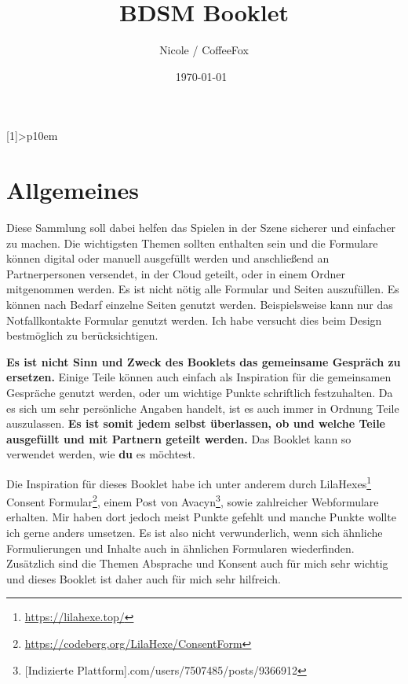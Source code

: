 \documentclass[a4paper,12pt]{article}
\begin{document}
\setlength\dashlinedash{0.2pt}
\setlength\dashlinegap{1.5pt}
\setlength\arrayrulewidth{0.3pt}
\newcolumntype{P}[1]{>{\centering\arraybackslash}p{10em}}


\title{BDSM Booklet}
\author{Nicole / CoffeeFox}
\date{\today \ \currenttime \bigbreak {}}
\renewcommand*\contentsname{Inhaltsverzeichnis}

\pagestyle{fancy}
\fancyhead{} %
\fancyfoot{} %
\fancyfoot[LE,RO]{\thepage}


\maketitle
\tableofcontents
\newpage


\section{Allgemeines}
Diese Sammlung soll dabei helfen das Spielen in der Szene sicherer und einfacher zu machen. Die wichtigsten Themen sollten enthalten sein und die Formulare können digital oder manuell ausgefüllt werden und anschließend an Partnerpersonen versendet, in der Cloud geteilt, oder in einem Ordner mitgenommen werden. Es ist nicht nötig alle Formular und Seiten auszufüllen. Es können nach Bedarf einzelne Seiten genutzt werden. Beispielsweise kann nur das Notfallkontakte Formular genutzt werden. Ich habe versucht dies beim Design bestmöglich zu berücksichtigen. \bigbreak

\textbf{Es ist nicht Sinn und Zweck des Booklets das gemeinsame Gespräch zu ersetzen.} Einige Teile können auch einfach als Inspiration für die gemeinsamen Gespräche genutzt werden, oder um wichtige Punkte schriftlich festzuhalten. Da es sich um sehr persönliche Angaben handelt, ist es auch immer in Ordnung Teile auszulassen. \textbf{Es ist somit jedem selbst überlassen, ob und welche Teile ausgefüllt und mit Partnern geteilt werden.} Das Booklet kann so verwendet werden, wie \textbf{du} es möchtest. \bigbreak

Die Inspiration für dieses Booklet habe ich unter anderem durch LilaHexes\footnote{\url{https://lilahexe.top/}} \glqq Consent Formular\grqq \footnote{\url{https://codeberg.org/LilaHexe/ConsentForm}}, einem Post von Avacyn\footnote{[Indizierte Plattform].com/users/7507485/posts/9366912}, sowie zahlreicher Webformulare erhalten. Mir haben dort jedoch meist Punkte gefehlt und manche Punkte wollte ich gerne anders umsetzen. Es ist also nicht verwunderlich, wenn sich ähnliche Formulierungen und Inhalte auch in ähnlichen Formularen wiederfinden. Zusätzlich sind die Themen Absprache und Konsent auch für mich sehr wichtig und dieses Booklet ist daher auch für mich sehr hilfreich. \bigbreak
\end{document}
